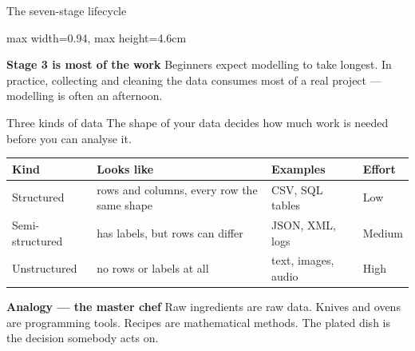 \documentclass[10pt,aspectratio=169]{beamer}
\newcommand{\trapbox}[2]{%
  \begin{alertblock}{\textbf{#1}}
  #2
  \end{alertblock}%
}
\newcommand{\analogybox}[2]{%
  \begin{exampleblock}{\textbf{Analogy --- #1}}
  #2
  \end{exampleblock}%
}
\begin{document}
\begin{frame}{The seven-stage lifecycle}
\begin{center}
\begin{adjustbox}{max width=0.94\linewidth, max height=4.6cm}
\end{adjustbox}
\end{center}
\vspace{0.3cm}
\trapbox{Stage 3 is most of the work}{Beginners expect modelling to take longest. In practice, collecting and cleaning the data consumes most of a real project --- modelling is often an afternoon.}
\end{frame}

\begin{frame}{Three kinds of data}
The shape of your data decides how much work is needed before you can analyse it.
\begin{table}
\small
\begin{tabularx}{\linewidth}{@{}lXXl@{}}
\toprule
\textbf{Kind} & \textbf{Looks like} & \textbf{Examples} & \textbf{Effort} \\
\midrule
Structured & rows and columns, every row the same shape & CSV, SQL tables & Low \\
Semi-structured & has labels, but rows can differ & JSON, XML, logs & Medium \\
Unstructured & no rows or labels at all & text, images, audio & High \\
\bottomrule
\end{tabularx}
\end{table}
\analogybox{the master chef}{Raw ingredients are raw data. Knives and ovens are programming tools. Recipes are mathematical methods. The plated dish is the decision somebody acts on.}
\end{frame}
\end{document}
